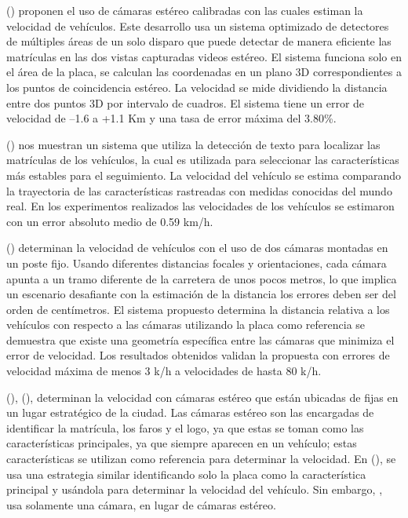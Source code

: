 \citeauthor{yang2019Vehicle} (\cite{yang2019Vehicle}) proponen el uso de cámaras estéreo calibradas con las cuales estiman la velocidad de vehículos. Este desarrollo usa un sistema optimizado de detectores de múltiples áreas de un solo disparo que puede detectar de manera eficiente las matrículas en las dos vistas capturadas videos estéreo. El sistema funciona solo en el área de la placa, se calculan las coordenadas en un plano 3D correspondientes a los puntos de coincidencia estéreo. La velocidad se mide dividiendo la distancia entre dos puntos 3D por intervalo de cuadros. El sistema tiene un error de velocidad de –1.6 a +1.1 Km y una tasa de error máxima del 3.80\%. 

\citeauthor{luvizon2014Vehicle} (\cite{luvizon2014Vehicle}) nos muestran un sistema que utiliza la detección de texto para localizar las matrículas de los vehículos, la cual es utilizada para seleccionar las características más estables para el seguimiento. La velocidad del vehículo se estima comparando la trayectoria de las características rastreadas con medidas conocidas del mundo real. En los experimentos realizados las velocidades de los vehículos se estimaron con un error absoluto medio de 0.59 km/h. 

\citeauthor{llorca2016Two} (\cite{llorca2016Two}) determinan la velocidad de vehículos con el uso de dos cámaras montadas en un poste fijo. Usando diferentes distancias focales y orientaciones, cada cámara apunta a un tramo diferente de la carretera de unos pocos metros, lo que implica un escenario desafiante con la estimación de la distancia los errores deben ser del orden de centímetros.  El sistema propuesto determina la distancia relativa a los vehículos con respecto a las cámaras utilizando la placa como referencia se demuestra que existe una geometría específica entre las cámaras que minimiza el error de velocidad. Los resultados obtenidos validan la propuesta con errores de velocidad máxima de menos 3 k/h a velocidades de hasta 80 k/h. 

\citeauthor{yang2021Robust} (\cite{yang2021Robust}), \citeauthor{yang2021Improved} (\cite{yang2021Improved}), determinan la velocidad con cámaras estéreo que están ubicadas de fijas en un lugar estratégico de la ciudad. Las cámaras estéreo son las encargadas de identificar la matrícula, los faros y el logo, ya que estas se toman como las características principales, ya que siempre aparecen en un vehículo; estas características se utilizan como referencia para determinar la velocidad. En \citeauthor{vakili2020Single} (\cite{vakili2020Single}), se usa una estrategia similar identificando solo la placa como la característica principal y usándola para determinar la velocidad del vehículo. Sin embargo, \citeauthor{vakili2020Single}, usa solamente una cámara, en lugar de cámaras estéreo. 

